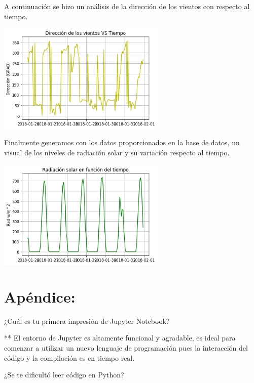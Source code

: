\documentclass{article} %
\begin{document}
A continuación se hizo un análisis de la dirección de los vientos con respecto al tiempo.

 \begin{center}
 	\includegraphics[width=8cm]{5.png}
 \end{center}

Finalmente generamos con los datos proporcionados en la base de datos, un visual de los niveles de radiación solar y su variación respecto al tiempo.

 \begin{center}
 	\includegraphics[width=8cm]{6.png}
 \end{center}


\section*{Apéndice:}
\hspace{0.45 cm} ¿Cuál es tu primera impresión de Jupyter Notebook?

\vspace{0.5 cm}

** El entorno de Jupyter es altamente funcional y agradable, es ideal para comenzar a utilizar un nuevo lenguaje de programación pues la interacción del código y la compilación es en tiempo real.

\vspace{0.5 cm}

¿Se te dificultó leer código en Python?

\vspace{0.5 cm}
\end{document}
